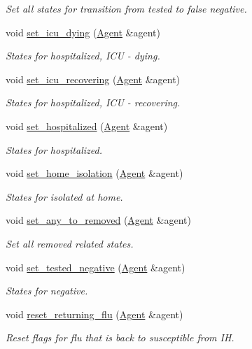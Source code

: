 \begin{DoxyCompactItemize}
\begin{DoxyCompactList}\small\item\em Set all states for transition from tested to false negative. \end{DoxyCompactList}\item 
void \hyperlink{classHspEmployeeStatesManager_aa5f8881bc33d8b92965d828295cc5251}{set\+\_\+icu\+\_\+dying} (\hyperlink{classAgent}{Agent} \&agent)
\begin{DoxyCompactList}\small\item\em States for hospitalized, I\+CU -\/ dying. \end{DoxyCompactList}\item 
void \hyperlink{classHspEmployeeStatesManager_acb3bbc5680fafac83634f93975d6f684}{set\+\_\+icu\+\_\+recovering} (\hyperlink{classAgent}{Agent} \&agent)
\begin{DoxyCompactList}\small\item\em States for hospitalized, I\+CU -\/ recovering. \end{DoxyCompactList}\item 
void \hyperlink{classHspEmployeeStatesManager_a33035540117578d7a090458c89a7cf33}{set\+\_\+hospitalized} (\hyperlink{classAgent}{Agent} \&agent)
\begin{DoxyCompactList}\small\item\em States for hospitalized. \end{DoxyCompactList}\item 
void \hyperlink{classHspEmployeeStatesManager_ab41695ae171267f0aac57a1d7ddfe154}{set\+\_\+home\+\_\+isolation} (\hyperlink{classAgent}{Agent} \&agent)
\begin{DoxyCompactList}\small\item\em States for isolated at home. \end{DoxyCompactList}\item 
void \hyperlink{classHspEmployeeStatesManager_a81c114346fa3ca81ed104ba2c5db9b49}{set\+\_\+any\+\_\+to\+\_\+removed} (\hyperlink{classAgent}{Agent} \&agent)
\begin{DoxyCompactList}\small\item\em Set all removed related states. \end{DoxyCompactList}\item 
void \hyperlink{classHspEmployeeStatesManager_a3b9a2c2ac3b20777c5c7d75dc6f9c002}{set\+\_\+tested\+\_\+negative} (\hyperlink{classAgent}{Agent} \&agent)
\begin{DoxyCompactList}\small\item\em States for negative. \end{DoxyCompactList}\item 
void \hyperlink{classHspEmployeeStatesManager_a8a648a456fb00140b8362201e034a05a}{reset\+\_\+returning\+\_\+flu} (\hyperlink{classAgent}{Agent} \&agent)
\begin{DoxyCompactList}\small\item\em Reset flags for flu that is back to susceptible from IH. \end{DoxyCompactList}\end{DoxyCompactItemize}


